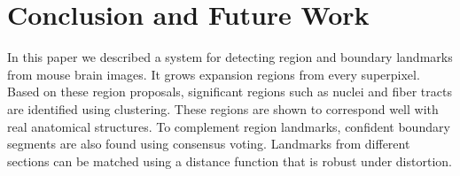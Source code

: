 \documentclass{llncs}
\begin{document}
%
%
%
%
%
%
%
%
%
%
%
%
%
%
%
%
%
%
%
%
%
%
%

%



\section{Conclusion and Future Work}

In this paper we described a system for detecting region and boundary landmarks from mouse brain images. It grows expansion regions from every superpixel. Based on these region proposals, significant regions such as nuclei and fiber tracts are identified using clustering. These regions are shown to correspond well with real anatomical structures. To complement region landmarks, confident boundary segments are also found using consensus voting. Landmarks from different sections can be matched using a distance function that is robust under distortion.
\end{document}
